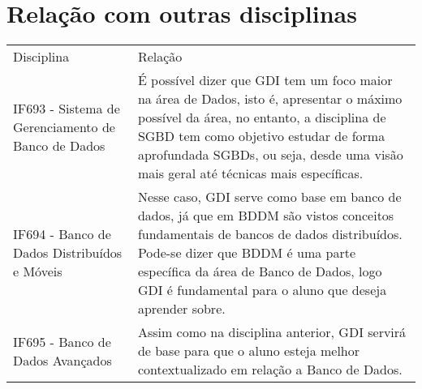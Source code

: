 \documentclass[10pt]{article}
\begin{document}
\section{Relação com outras disciplinas}

\begin{table}[h]
 \centering
 {\renewcommand\arraystretch{1.25}
 \begin{tabular}{ l l }
  \cline{1-1}\cline{2-2}  
    \multicolumn{1}{|p{3cm}|}{Disciplina \centering } &
    \multicolumn{1}{p{6cm}|}{Relação \centering }
  \\ 
  \cline{1-1}\cline{2-2}  
    \multicolumn{1}{|p{3cm}|}{IF693 -  Sistema de Gerenciamento de Banco de Dados \centering } &
    \multicolumn{1}{p{6cm}|}{É possível dizer que GDI tem um foco maior na área de Dados, isto é, apresentar o máximo possível da área, no entanto, a disciplina de SGBD tem como objetivo estudar de forma aprofundada SGBDs, ou seja, desde uma visão mais geral até técnicas mais específicas.}
  \\ 
  \cline{1-1}\cline{2-2}  
    \multicolumn{1}{|p{3cm}|}{IF694 - Banco de Dados Distribuídos e Móveis \centering } &
    \multicolumn{1}{p{6cm}|}{Nesse caso, GDI serve como base em banco de dados, já que em BDDM são vistos conceitos fundamentais de bancos de dados distribuídos. Pode-se dizer que BDDM é uma parte específica da área de Banco de Dados, logo GDI é fundamental para o aluno que deseja aprender sobre.}
  \\
  \cline{1-1}\cline{2-2}  
    \multicolumn{1}{|p{3cm}|}{IF695 - Banco de Dados Avançados \centering } &
    \multicolumn{1}{p{6cm}|}{Assim como na disciplina anterior, GDI servirá de base para que o aluno esteja melhor contextualizado em relação a Banco de Dados.}
  \\ 
  \hline
\end{tabular}}
\end{table}



\end{document}

